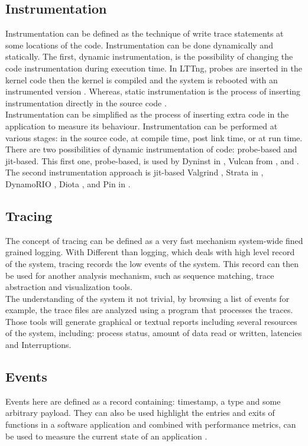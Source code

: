 \subsection{Instrumentation}
Instrumentation can be defined as the technique of write trace statements at some locations of the code. 
Instrumentation can be done dynamically and statically. The first, dynamic instrumentation, is the possibility of changing the code instrumentation during execution time. In LTTng, probes are inserted in the kernel code then the kernel is compiled and the system is rebooted with an instrumented version \cite{Weber2012TFC23574872357581}.
Whereas, static instrumentation is the process of inserting instrumentation directly in the source code \cite{Graham82gprofa}. \\
Instrumentation can be simplified as the process of inserting extra code in the application to measure its behaviour. Instrumentation can be performed at various stages: in the source code, at compile time, post link time, or at run time. \\
There are two possibilities of dynamic instrumentation of code: probe-based and jit-based.  This first one, probe-based, is used by  Dyninst in \cite{dyninst}, Vulcan from \cite{Vulcan}, and \cite{dtrace}.  The second instrumentation approach is jit-based Valgrind \cite{Valgrind}, Strata in \cite{Strata}, DynamoRIO \cite{DynamoRIO}, Diota \cite{Diota}, and Pin in \cite{Pin}.

\subsection{Tracing}
The concept of tracing can be defined as a very fast mechanism system-wide fined grained logging. With Different than logging, which deals with high level record of the system, tracing records the low events of the system. This record can then be used for another analysis mechanism, such as sequence matching, trace abstraction and visualization tools.\\
The understanding of the system it not trivial, by browsing a list of events for example, the trace files are analyzed using a program that processes the traces. Those tools will generate graphical or textual reports including several resources of the system, including: process status, amount of data read or written, latencies and Interruptions.

\subsection{Events}
Events here are defined as a record containing: timestamp, a type and some arbitrary payload. They can also be used highlight the entries and exits of functions in a software application and combined with performance metrics, can be used to measure the current state of an application \cite{giraldeau-ols2011}.

